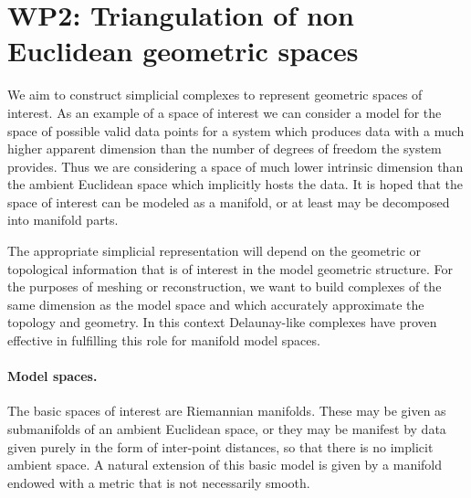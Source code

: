 %

\newcommand{\man}{\mathcal{M}}
\newcommand{\reel}{\mathbb{R}}
\newcommand{\rdee}{\reel^d}
\renewcommand{\pts}{P}
\newcommand{\mesh}{\hat{M}}

\newcommand{\ramsay}[1]{\rred{[[#1]]}}

\section*{WP2: Triangulation of non Euclidean geometric spaces}%

We aim to construct simplicial complexes to represent
geometric spaces of interest. As an example of a space of interest we
can consider a model for the space of possible valid data points for a
system which produces data with a much higher apparent dimension than
the number of degrees of freedom  the system provides. Thus we are
considering a space of much lower intrinsic dimension than the ambient
Euclidean space which implicitly hosts the data. It is hoped that the
space of interest can be modeled as a manifold, or at least may be
decomposed into manifold parts. 

The appropriate simplicial representation will depend on the geometric
or topological information that is of interest in the model geometric
structure. For the purposes of meshing or reconstruction, we want to
build complexes of the same dimension as the model space and which
accurately approximate the topology and geometry. In this context
Delaunay-like complexes have proven effective in fulfilling this role
for manifold model spaces.


\paragraph{Model spaces.} 
The basic spaces of interest are Riemannian manifolds. These may be
given as submanifolds of an ambient Euclidean space, or they may be
manifest by data given purely in the form of inter-point distances, so
that there is no implicit ambient space.  
A natural extension of this basic model is given by a manifold endowed
with a metric that is not necessarily smooth. 

